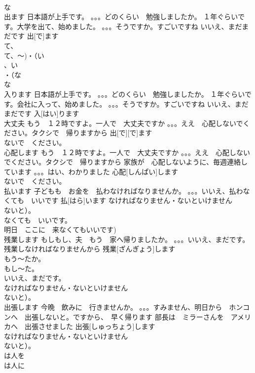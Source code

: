 \documentclass[8pt]{extreport}
\begin{document}
\begin{CJK}{UTF8}{min}
\\	な
\\	出ます	日本語が上手です。 。。。どのくらい　勉強しましたか。 １年ぐらいです。大学を出て、始めました。 。。。そうですか。すごいですね いいえ、まだまだです	出[で]ます			
\\	て、
\\	て、～)・（い
\\	、い
\\	・（な
\\	な
\\	入ります	日本語が上手です。 。。。どのくらい　勉強しましたか。 １年ぐらいです。会社に入って、始めました。 。。。そうですか。すごいですね いいえ、まだまだです	入[はい]ります					
\\	大丈夫	もう　１２時ですよ。一人で　大丈夫ですか 。。。ええ　心配しないでください。タクシで　帰りますから	出[で][で]ます			
\\	ないで　ください。
\\	心配します	もう　１２時ですよ。一人で　大丈夫ですか 。。。ええ　心配しないでください。タクシで　帰りますから 家族が　心配しないように、毎週連絡しています 。。。はい、わかりました	心配[しんぱい]します			
\\	ないで　ください。
\\	払います	子どもも　お金を　払わなければなりませんか。 。。。いいえ、払わなくても　いいです	払[はら]います				なければなりません・ないといけません
\\	ないと）。
\\	なくても　いいです。
\\	明日　ここに　来なくてもいいです)	
\\	残業します	もしもし、夫　もう　家へ帰りましたか。 。。。いいえ、まだです。残業しなければなりませんから	残業[ざんぎょう]します			
\\	もう～たか。
\\	もし～た。
\\	いいえ、まだです。 
\\	なければなりません・ないといけません
\\	ないと）。
\\	出張します	今晩　飲みに　行きませんか。 。。。すみません、明日から　ホンコンへ　出張しないと。ですから、　早く帰ります 部長は　ミラーさんを　アメリカへ　出張させました	出張[しゅっちょう]します			
\\	なければなりません・ないといけません
\\	ないと）。
\\	は人を
\\	は人に

\end{CJK}
\end{document}
